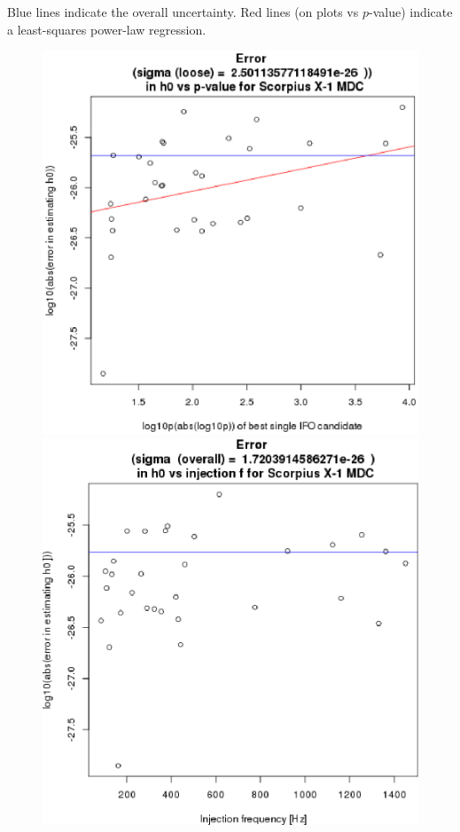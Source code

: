 Blue lines indicate the overall uncertainty. 
Red lines (on plots vs $p$-value) indicate a least-squares power-law regression.

\begin{figure}
\begin{center}
\includegraphics[trim=0 10 10 15, clip, width=0.52\paperwidth,height=0.36\paperheight]{Errorh0.eps}
\includegraphics[trim=0 0 0 10, clip, width=0.52\paperwidth,height=0.36\paperheight]{plots/Errorh0vsF-overall.eps}

\end{center}
\end{figure}
